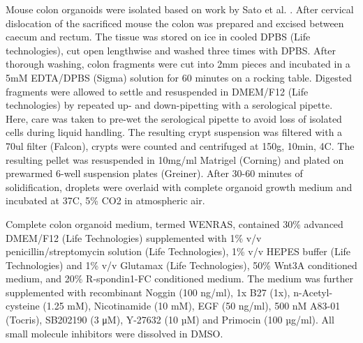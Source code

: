 \begin{flushleft}
Mouse colon organoids were isolated based on work by Sato et al. \parencite{satoSingleLgr5Stem2009}. After cervical dislocation of the sacrificed mouse the colon was prepared and excised between caecum and rectum. The tissue was stored on ice in cooled DPBS (Life technologies), cut open lengthwise and washed three times with DPBS. After thorough washing, colon fragments were cut into 2mm pieces and incubated in a 5mM EDTA/DPBS (Sigma) solution for 60 minutes on a rocking table. Digested fragments were allowed to settle and resuspended in DMEM/F12 (Life technologies) by repeated up- and down-pipetting with a serological pipette. Here, care was taken to pre-wet the serological pipette to avoid loss of isolated cells during liquid handling. The resulting crypt suspension was filtered with a 70ul filter (Falcon), crypts were counted and centrifuged at 150g, 10min, 4C. The resulting pellet was resuspended in 10mg/ml Matrigel (Corning) and plated on prewarmed 6-well suspension plates (Greiner). After 30-60 minutes of solidification, droplets were overlaid with complete organoid growth medium and incubated at 37C, 5\% CO2 in atmospheric air.

Complete colon organoid medium, termed WENRAS, contained 30\% advanced DMEM/F12 (Life Technologies) supplemented with 1\% v/v penicillin/streptomycin solution (Life Technologies), 1\% v/v HEPES buffer (Life Technologies) and 1\% v/v Glutamax (Life Technologies), 50\% Wnt3A conditioned medium, and 20\% R-spondin1-FC conditioned medium. 
The medium was further supplemented with recombinant Noggin (100 ng/ml), 1x B27 (1x), n-Acetyl-cysteine (1.25 mM), Nicotinamide (10 mM), EGF (50 ng/ml), 500 nM A83-01 (Tocris), SB202190 (3 μM), Y-27632 (10 µM) and Primocin (100 µg/ml). All small molecule inhibitors were dissolved in DMSO. 



\end{flushleft}
